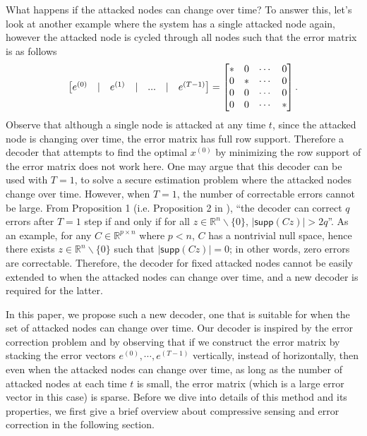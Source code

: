 \documentclass[journal]{IEEEtran}
\begin{document}
What happens if the attacked nodes can change over time? To answer this, let's look at another example where the system has a single attacked node again, however the attacked node is cycled through all nodes such that the error matrix is as follows
\begin{equation}
	\begin{bmatrix} e^{(0)}  & \lvert & e^{(1)} & \lvert &  ... &  \lvert & e^{(T-1)} \end{bmatrix} = \begin{bmatrix} * & 0 & \cdots & 0 \\
					       0 & * & \cdots & 0 \\
					       0 & 0 & \cdots & 0 \\
					       0 & 0 & \cdots & * 
			\end{bmatrix}. \nonumber \\
\end{equation}
Observe that although a single node is attacked at any time $t$, since the attacked node is changing over time, the error matrix has full row support. Therefore a decoder that attempts to find the optimal $x^{(0)}$ by minimizing the row support of the error matrix does not work here. One may argue that this decoder can be used with $T=1$, to solve a secure estimation problem where the attacked nodes change over time. 
However, when $T=1$, the number of correctable errors cannot be large.
From Proposition 1 (i.e. Proposition 2 in \cite{Fawzi2014}), ``the decoder can correct $q$ errors after $T=1$ step if and only if for all $z \in \mathbb{R}^n \backslash \{0\}$, $\lvert \textsf{supp} (Cz) \rvert > 2q$''. 
As an example, for any $C \in \mathbb{R}^{p \times n}$ where $p<n$, $C$ has a nontrivial null space, hence there exists $z \in \mathbb{R}^n \backslash \{ 0 \}$ such that $ \lvert \textsf{supp} (Cz) \rvert = 0$; in other words, zero errors are correctable. Therefore, the decoder for fixed attacked nodes cannot be easily extended to when the attacked nodes can change over time, and a new decoder is required for the latter.

In this paper, we propose such a new decoder, one that is suitable for when the set of attacked nodes can change over time. Our decoder is inspired by the error correction problem \cite{Candes_Tao} and by observing that if we construct the error matrix by stacking the error vectors $e^{(0)}, \cdots, e^{(T-1)}$ vertically, instead of horizontally, then even when the attacked nodes can change over time, as long as the number of attacked nodes at each time $t$ is small, the error matrix (which is a large error vector in this case) is sparse. Before we dive into details of this method and its properties, we first give a brief overview about compressive sensing and error correction in the following section.
\end{document}
